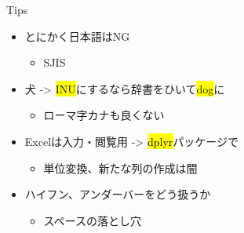 \documentclass[ignorenonframetext,]{beamer}
\begin{document}
\begin{frame}{\faMagic Tips}

\begin{itemize}
\itemsep1pt\parskip0pt
\item
  とにかく日本語はNG

  \begin{itemize}
  \itemsep1pt\parskip0pt
  \item
    SJIS
  \end{itemize}
\item
  犬 -\textgreater{} \hl{INU}にするなら辞書をひいて\hl{dog}に

  \begin{itemize}
  \itemsep1pt\parskip0pt
  \item
    ローマ字カナも良くない
  \end{itemize}
\item
  Excelは入力・閲覧用 -\textgreater{} \hl{dplyr}パッケージで

  \begin{itemize}
  \itemsep1pt\parskip0pt
  \item
    単位変換、新たな列の作成は闇
  \end{itemize}
\item
  ハイフン、アンダーバーをどう扱うか

  \begin{itemize}
  \itemsep1pt\parskip0pt
  \item
    スペースの落とし穴
  \end{itemize}
\end{itemize}

\end{frame}

\begin{frame}


\end{frame}
\end{document}
